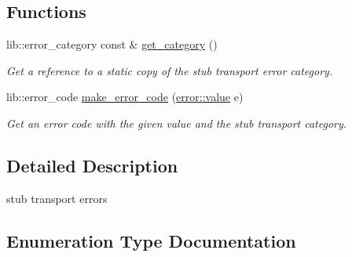 \subsection*{Functions}
\begin{DoxyCompactItemize}
\item 
\mbox{\label{namespacewebsocketpp_1_1transport_1_1stub_1_1error_aa724815b97c5d35092bfda373b1e7221}} 
lib\+::error\+\_\+category const  \& \mbox{\hyperlink{namespacewebsocketpp_1_1transport_1_1stub_1_1error_aa724815b97c5d35092bfda373b1e7221}{get\+\_\+category}} ()
\begin{DoxyCompactList}\small\item\em Get a reference to a static copy of the stub transport error category. \end{DoxyCompactList}\item 
\mbox{\label{namespacewebsocketpp_1_1transport_1_1stub_1_1error_a3d51de99e5f0e3695bd69975e8746b27}} 
lib\+::error\+\_\+code \mbox{\hyperlink{namespacewebsocketpp_1_1transport_1_1stub_1_1error_a3d51de99e5f0e3695bd69975e8746b27}{make\+\_\+error\+\_\+code}} (\mbox{\hyperlink{namespacewebsocketpp_1_1transport_1_1stub_1_1error_abff42d9e608f90864af8d628f6932022}{error\+::value}} e)
\begin{DoxyCompactList}\small\item\em Get an error code with the given value and the stub transport category. \end{DoxyCompactList}\end{DoxyCompactItemize}


\subsection{Detailed Description}
stub transport errors 

\subsection{Enumeration Type Documentation}
\mbox{\label{namespacewebsocketpp_1_1transport_1_1stub_1_1error_abff42d9e608f90864af8d628f6932022}} 
